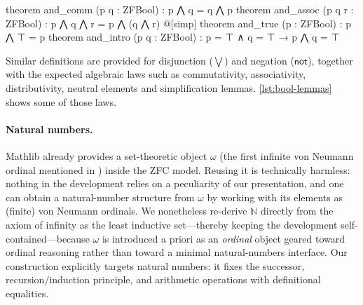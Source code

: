 \begin{leanlisting}[title={Some simplification lemmas for ZFC Booleans.}, label=lst:bool-lemmas, float=t]
theorem and_comm  (p q : ZFBool)   : p ⋀ q = q ⋀ p
theorem and_assoc (p q r : ZFBool) : p ⋀ q ⋀ r = p ⋀ (q ⋀ r)
@[simp]
theorem and_true  (p : ZFBool)     : p ⋀ ⊤ = p
theorem and_intro (p q : ZFBool)   : p = ⊤ ∧ q = ⊤ → p ⋀ q = ⊤
\end{leanlisting}

Similar definitions are provided for disjunction ($\bigvee$) and negation ($\mathsf{not}$), together with the expected algebraic laws such as commutativity, associativity, distributivity, neutral elements and simplification lemmas.
\cref{lst:bool-lemmas} shows some of those laws.

\paragraph*{Natural numbers.}
Mathlib already provides a set-theoretic object $\omega$ (the first infinite von Neumann ordinal mentioned in ) inside the ZFC model.
Reusing it is technically harmless: nothing in the development relies on a peculiarity of our presentation, and one can obtain a natural-number structure from $\omega$ by working with its elements as (finite) von Neumann ordinals.
We nonetheless re-derive $\mathbb{N}$ directly from the axiom of infinity as the least inductive set---thereby keeping the development self-contained---because $\omega$ is introduced a priori as an \emph{ordinal} object geared toward ordinal reasoning rather than toward a minimal natural-numbers interface.
Our construction explicitly targets natural numbers: it fixes the successor, recursion/induction principle, and arithmetic operations with definitional equalities.

